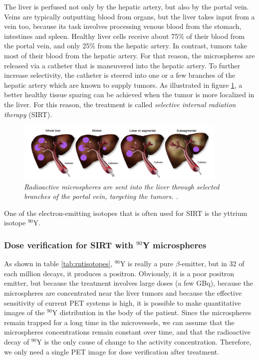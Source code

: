 \documentclass[11pt,oneside]{book}
\begin{document}
The liver is perfused not only by the hepatic artery, but also by the
portal vein. Veins are typically outputting blood from organs, but the
liver takes input from a vein too, because its task involves
processing venous blood from the stomach, intestines and
spleen. Healthy liver cells receive about 75\% of their blood from the
portal vein, and only 25\% from the hepatic artery. In contrast,
tumors take most of their blood from the hepatic artery. For that
reason, the microspheres are released via a catheter that is
maneuvered into the hepatic artery. To further increase selectivity,
the catheter is steered into one or a few branches of the hepatic
artery which are known to supply tumors. As illustrated in figure
\ref{fig:Sangro}, a better healthy tissue sparing can be achieved when
the tumor is more localized in the liver. For this reason, the
treatment is called {\em selective internal radiation therapy} (SIRT).
\begin{figure}[tb]
\centering
\includegraphics[width=0.9\textwidth]{figs/fig_SIRT_Sangro.png}
\caption{\label{fig:Sangro} \emph{Radioactive microspheres are sent
    into the liver through selected branches of the portal vein, targeting
    the tumors. \cite{Sangro2012}.}}
\end{figure}
One of the electron-emitting isotopes that is often used for SIRT
is the yttrium isotope $^{90}$Y. 

\subsubsection{Dose verification for SIRT with $^{90}$Y microspheres}
As shown in table \ref{tab:rntisotopes}, $^{90}$Y is really a pure
$\beta$-emitter, but in 32 of each million decays, it produces a
positron. Obviously, it is a poor positron emitter, but because the
treatment involves large doses (a few GBq), because the microspheres
are concentrated near the liver tumors and because the effective
sensitivity of current PET systems is high, it is possible to make
quantitative images of the $^{90}$Y distribution in the body of the
patient. Since the microspheres remain trapped for a long time in the
microvessels, we can assume that the microspheres concentrations
remain constant over time, and that the radioactive decay of $^{90}$Y
is the only cause of change to the activity concentration. Therefore,
we only need a single PET image for dose verification after
treatment. 
\end{document}
